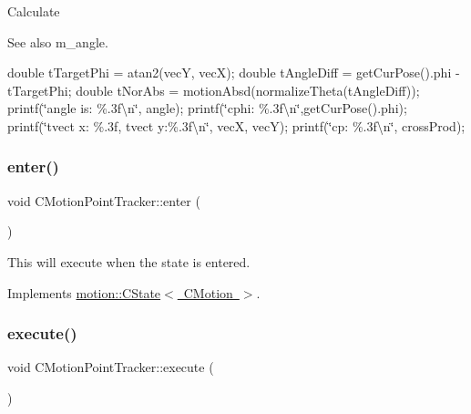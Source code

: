 Calculate \begin{DoxySeeAlso}{See also}
m\+\_\+angle. 
\end{DoxySeeAlso}
double t\+Target\+Phi = atan2(vec\+Y, vec\+X); double t\+Angle\+Diff = get\+Cur\+Pose().phi -\/ t\+Target\+Phi; double t\+Nor\+Abs = motion\+Absd(normalize\+Theta(t\+Angle\+Diff)); ~\newline
~\newline
 printf(\char`\"{}angle is\+: \%.\+3f\textbackslash{}n\char`\"{}, angle); printf(\char`\"{}cphi\+: \%.\+3f\textbackslash{}n\char`\"{},get\+Cur\+Pose().phi); ~\newline
 printf(\char`\"{}tvect x\+: \%.\+3f, tvect y\+:\%.\+3f\textbackslash{}n\char`\"{}, vecX, vecY); printf(\char`\"{}cp\+: \%.\+3f\textbackslash{}n\char`\"{}, cross\+Prod); \mbox{\label{classmotion_1_1CMotionPointTracker_a77975b88cc198d7115910dd0e738f925}} 
\subsubsection{\texorpdfstring{enter()}{enter()}}
{\footnotesize\ttfamily void C\+Motion\+Point\+Tracker\+::enter (\begin{DoxyParamCaption}\item[{\mbox{\hyperlink{classmotion_1_1CMotion}{C\+Motion}} $\ast$}]{ }\end{DoxyParamCaption})\hspace{0.3cm}{\ttfamily [virtual]}}

This will execute when the state is entered. 

Implements \mbox{\hyperlink{classmotion_1_1CState_a53d5fcfec223b58ccdd364a8430fd23c}{motion\+::\+C\+State$<$ C\+Motion $>$}}.

\mbox{\label{classmotion_1_1CMotionPointTracker_a2513b0d052536d307db674af8ee8a3e6}} 
\subsubsection{\texorpdfstring{execute()}{execute()}}
{\footnotesize\ttfamily void C\+Motion\+Point\+Tracker\+::execute (\begin{DoxyParamCaption}\item[{\mbox{\hyperlink{classmotion_1_1CMotion}{C\+Motion}} $\ast$}]{ }\end{DoxyParamCaption})\hspace{0.3cm}{\ttfamily [virtual]}}

